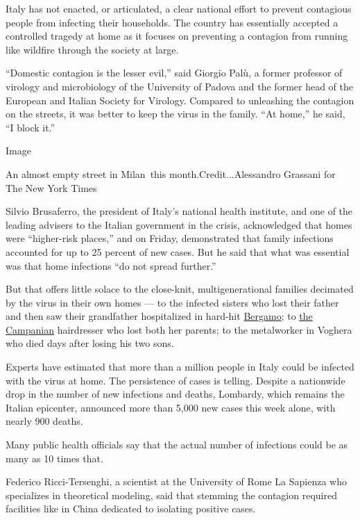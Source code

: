 Italy has not enacted, or articulated, a clear national effort to
prevent contagious people from infecting their households. The country
has essentially accepted a controlled tragedy at home as it focuses on
preventing a contagion from running like wildfire through the society at
large.

``Domestic contagion is the lesser evil,'' said Giorgio Palù, a former
professor of virology and microbiology of the University of Padova and
the former head of the European and Italian Society for Virology.
Compared to unleashing the contagion on the streets, it was better to
keep the virus in the family. ``At home,'' he said, ``I block it.''

Image

An almost empty street in Milan~this month.Credit...Alessandro Grassani
for The New York Times

Silvio Brusaferro, the president of Italy's national health institute,
and one of the leading advisers to the Italian government in the crisis,
acknowledged that homes were ``higher-risk places,'' and on Friday,
demonstrated that family infections accounted for up to 25 percent of
new cases. But he said that what was essential was that home infections
``do not spread further.''

But that offers little solace to the close-knit, multigenerational
families decimated by the virus in their own homes --- to the infected
sisters who lost their father and then saw their grandfather
hospitalized in hard-hit
\href{https://www.nytimes3xbfgragh.onion/interactive/2020/03/27/world/europe/coronavirus-italy-bergamo.html?searchResultPosition=8}{Bergamo};
to
\href{https://www.nytimes3xbfgragh.onion/2020/04/21/world/europe/italy-coronavirus-south.html?searchResultPosition=3}{the
Campanian} hairdresser who lost both her parents; to the metalworker in
Voghera who died days after losing his two sons.

Experts have estimated that more than a million people in Italy could be
infected with the virus at home. The persistence of cases is telling.
Despite a nationwide drop in the number of new infections and deaths,
Lombardy, which remains the Italian epicenter, announced more than 5,000
new cases this week alone, with nearly 900 deaths.

Many public health officials say that the actual number of infections
could be as many as 10 times that.

Federico Ricci-Tersenghi, a scientist at the University of Rome La
Sapienza who specializes in theoretical modeling, said that stemming the
contagion required facilities like in China dedicated to isolating
positive cases.

